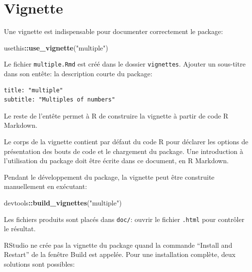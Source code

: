 \documentclass[
  12pt,
  french,
  a4paper,
  extrafontsizes,onecolumn,openright
  ]{memoir}
\newenvironment{Shaded}{\begin{snugshade}}{\end{snugshade}}
\newcommand{\FunctionTok}[1]{\textcolor[rgb]{0.13,0.29,0.53}{\textbf{#1}}}
\newcommand{\NormalTok}[1]{#1}
\newcommand{\SpecialCharTok}[1]{\textcolor[rgb]{0.81,0.36,0.00}{\textbf{#1}}}
\newcommand{\StringTok}[1]{\textcolor[rgb]{0.31,0.60,0.02}{#1}}
\begin{document}
\section{Vignette}\label{vignette}

Une vignette est indispensable pour documenter correctement le package:

\scriptsize

\begin{Shaded}
\begin{Highlighting}[]
\NormalTok{usethis}\SpecialCharTok{::}\FunctionTok{use\_vignette}\NormalTok{(}\StringTok{"multiple"}\NormalTok{)}
\end{Highlighting}
\end{Shaded}

\normalsize

Le fichier \texttt{multiple.Rmd} est créé dans le dossier \texttt{vignettes}.
Ajouter un sous-titre dans son entête: la description courte du package:

\begin{verbatim}
title: "multiple"
subtitle: "Multiples of numbers"
\end{verbatim}

Le reste de l'entête permet à R de construire la vignette à partir de code R Markdown.

Le corps de la vignette contient par défaut du code R pour déclarer les options de présentation des bouts de code et le chargement du package.
Une introduction à l'utilisation du package doit être écrite dans ce document, en R Markdown.

Pendant le développement du package, la vignette peut être construite manuellement en exécutant:

\scriptsize

\begin{Shaded}
\begin{Highlighting}[]
\NormalTok{devtools}\SpecialCharTok{::}\FunctionTok{build\_vignettes}\NormalTok{(}\StringTok{"multiple"}\NormalTok{) }
\end{Highlighting}
\end{Shaded}

\normalsize

Les fichiers produits sont placés dans \texttt{doc/}: ouvrir le fichier \texttt{.html} pour contrôler le résultat.

RStudio ne crée pas la vignette du package quand la commande \enquote{Install and Restart} de la fenêtre Build est appelée.
Pour une installation complète, deux solutions sont possibles:
\end{document}

